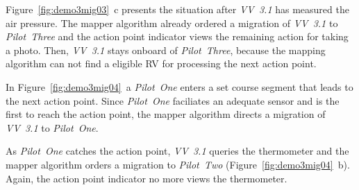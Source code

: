 Figure~\ref{fig:demo3mig03}~c presents the situation after \textit{VV~3.1} has measured the air pressure.
The mapper algorithm already ordered a migration of \textit{VV~3.1} to \textit{Pilot~Three} and
the action point indicator views the remaining action for taking a photo. 
%
Then, \textit{VV~3.1} stays onboard of \textit{Pilot~Three}, because the mapping algorithm can not find
a eligible \ac{RV} for processing the next action point. 

In Figure~\ref{fig:demo3mig04}~a \textit{Pilot~One} enters a set course segment that leads to the next
action point. Since \textit{Pilot~One} faciliates an adequate sensor and is the first to reach the action
point, the mapper algorithm directs a migration of \textit{VV~3.1} to \textit{Pilot~One}.

As \textit{Pilot~One} catches the action point, \textit{VV~3.1} queries the thermometer and the mapper
algorithm orders a migration to \textit{Pilot~Two} (Figure~\ref{fig:demo3mig04}~b).
Again, the action point indicator no more views the thermometer.

